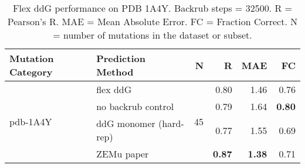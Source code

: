 \begin{table}
  \begin{tabular}{llrrrr}
\toprule
Mutation Category &       Prediction Method &   N &    R &  MAE &   FC \\
\midrule
 \multirow{ 4}{*}{pdb-1A4Y} & flex ddG & \multirow{ 4}{*}{45} & 0.80 & 1.46 & 0.76  \\
 & no backrub control & & 0.79 & 1.64 & \textbf{0.80}  \\
 & ddG monomer (hard-rep) & & 0.77 & 1.55 & 0.69  \\
 & ZEMu paper & & \textbf{0.87} & \textbf{1.38} & 0.71  \\
\bottomrule
\end{tabular}
  \caption[Flex ddG performance on PDB 1A4Y]{
    Flex ddG performance on PDB 1A4Y. Backrub steps = 32500. R = Pearson's R. MAE = Mean Absolute Error. FC = Fraction Correct. N = number of mutations in the dataset or subset.
  } \label{tab:table-pdb-1A4Y}
\end{table}
